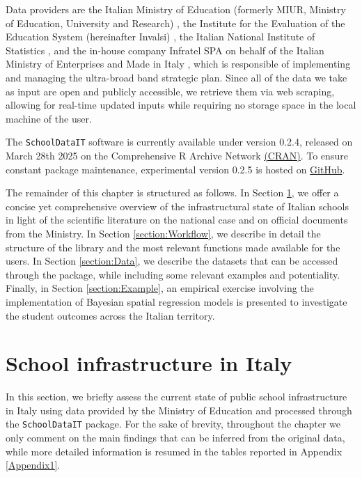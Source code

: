 \documentclass[openany]{book}
\begin{document}
Data providers are the Italian Ministry of Education (formerly MIUR, Ministry of Education, University and Research) \citep{MIUR}, the Institute for the Evaluation of the Education System (hereinafter Invalsi) \citep{Invalsi_IS}, the Italian National Institute of Statistics \citep[ISTAT,][]{InnerAreas, Situas, Shapefiles}, and the in-house company Infratel SPA on behalf of the Italian Ministry of Enterprises and Made in Italy \citep[MIMIT,][]{BB}, which is responsible of implementing and managing the ultra-broad band strategic plan. Since all of the data we take as input are open and publicly accessible, we retrieve them via web scraping, allowing for real-time updated inputs while requiring no storage space in the local machine of the user.

The \texttt{SchoolDataIT} software is currently available under version 0.2.4, released on March 28th 2025 on the Comprehensive R Archive Network \href{https://cran.r-project.org/web/packages/SchoolDataIT/index.html}{(CRAN)}. To ensure constant package maintenance, experimental version 0.2.5 is hosted on \href{https://github.com/lcef97/SchoolDataIT}{GitHub}.

The remainder of this chapter is structured as follows. In Section \ref{section:SchoolDataIT:Overview}, we offer a concise yet comprehensive overview of the infrastructural state of Italian schools in light of the scientific literature on the national case and on official documents from the Ministry. In Section \ref{section:Workflow}, we describe in detail the structure of the library and the most relevant functions made available for the users. In Section \ref{section:Data}, we describe the datasets that can be accessed through the package, while including some relevant examples and potentiality. Finally, in Section \ref{section:Example}, an empirical exercise involving the implementation of Bayesian spatial regression models is presented to investigate the student outcomes across the Italian territory.


\section{School infrastructure in Italy} \label{section:SchoolDataIT:Overview}


In this section, we briefly assess the current state of public school infrastructure in Italy using data provided by the Ministry of Education and processed through the \texttt{SchoolDataIT} package. For the sake of brevity, throughout the chapter we only comment on the main findings that can be inferred from the original data, while more detailed information is resumed in the tables reported in Appendix \ref{Appendix1}.
\end{document}
